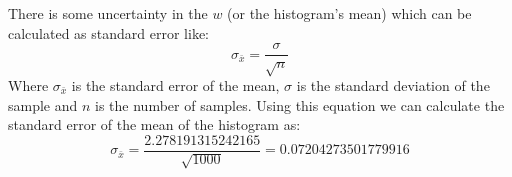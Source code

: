 \documentclass[a4paper,english]{article}
\begin{document}
        There is some uncertainty in the $w$ (or the histogram's mean) which can be calculated as standard error like:
        \begin{equation}
            \sigma_{\bar{x}} = \frac{\sigma}{\sqrt{n}}
        \end{equation}
        Where $\sigma_{\bar{x}}$ is the standard error of the mean, $\sigma$ is the standard deviation of the sample and $n$ is the number of samples. \newline
        Using this equation we can calculate the standard error of the mean of the histogram as:
        \begin{equation}
            \sigma_{\bar{x}} = \frac{2.278191315242165}{\sqrt{1000}} = 0.07204273501779916
        \end{equation}
        
\end{document}
